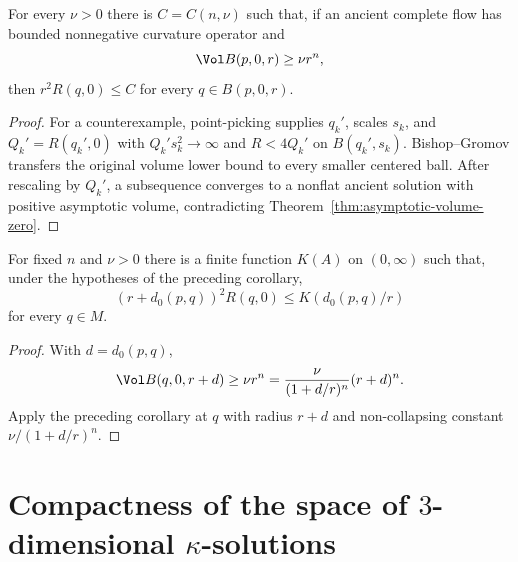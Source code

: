 \begin{corollary}\label{cor:volume-bound-implies-curvature-bound}
\label{bdvolbdcurv}
For every $\nu>0$ there is $C=C(n,\nu)$ such that, if an ancient
complete flow has bounded nonnegative curvature operator and
\[
 \Vol B(p,0,r)\geq\nu r^n,
\]
then $r^2R(q,0)\leq C$ for every $q\in B(p,0,r)$.
\end{corollary}
\begin{proof}
\sketch
{}
For a counterexample, point-picking supplies $q_k'$, scales $s_k$,
and $Q_k'=R(q_k',0)$ with $Q_k's_k^2\to\infty$ and
$R<4Q_k'$ on $B(q_k',s_k)$. Bishop--Gromov transfers the original
volume lower bound to every smaller centered ball. After rescaling
by $Q_k'$, a subsequence converges to a nonflat ancient solution
with positive asymptotic volume, contradicting
Theorem~\ref{thm:asymptotic-volume-zero}.
\end{proof}

\begin{corollary}\label{cor:global-curvature-bound-from-volume}
\label{global}
For fixed $n$ and $\nu>0$ there is a finite function $K(A)$ on
$(0,\infty)$ such that, under the hypotheses of the preceding
corollary,
\[
 (r+d_0(p,q))^2R(q,0)
 \leq K(d_0(p,q)/r)
\]
for every $q\in M$.
\end{corollary}
\begin{proof}
\sketch
{}
With $d=d_0(p,q)$,
\[
 \Vol B(q,0,r+d)\geq\nu r^n
 =\frac{\nu}{(1+d/r)^n}(r+d)^n.
\]
Apply the preceding corollary at $q$ with radius $r+d$ and
non-collapsing constant $\nu/(1+d/r)^n$.
\end{proof}

\section{Compactness of the space of $3$-dimensional
$\kappa$-solutions}

